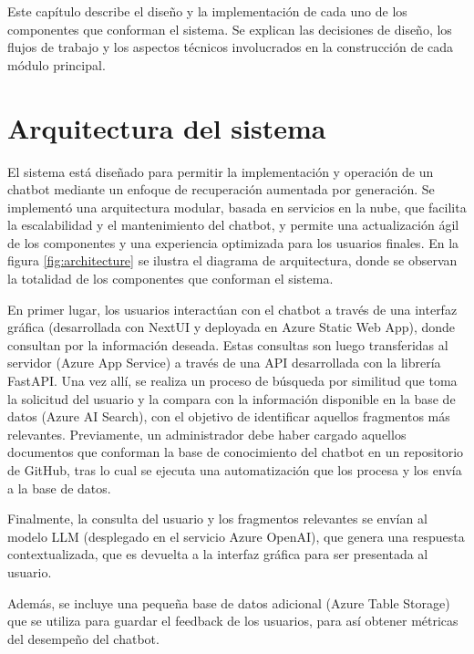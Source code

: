 
Este capítulo describe el diseño y la implementación de cada uno de los componentes que conforman el sistema.
Se explican las decisiones de diseño, los flujos de trabajo y los aspectos técnicos involucrados en la construcción de cada módulo principal.

\section{Arquitectura del sistema}

El sistema está diseñado para permitir la implementación y operación de un chatbot mediante un enfoque de recuperación aumentada por generación. 
Se implementó una arquitectura modular, basada en servicios en la nube, que facilita la escalabilidad y el mantenimiento del chatbot, y permite 
una actualización ágil de los componentes y una experiencia optimizada para los usuarios finales. En la figura \ref{fig:architecture} se ilustra
el diagrama de arquitectura, donde se observan la totalidad de los componentes que conforman el sistema.

En primer lugar, los usuarios interactúan con el chatbot a través de una interfaz gráfica (desarrollada con NextUI y deployada en Azure Static Web App), 
donde consultan por la información deseada. Estas consultas son luego transferidas al servidor (Azure App Service) a través de una API desarrollada 
con la librería FastAPI. Una vez allí, se realiza un proceso de búsqueda por similitud que toma la solicitud del usuario y la compara con la información
disponible en la base de datos (Azure AI Search), con el objetivo de identificar aquellos fragmentos más relevantes. Previamente, un administrador
debe haber cargado aquellos documentos que conforman la base de conocimiento del chatbot en un repositorio de GitHub, tras lo cual se ejecuta una 
automatización que los procesa y los envía a la base de datos.

Finalmente, la consulta del usuario y los fragmentos relevantes se envían al modelo LLM (desplegado en el servicio Azure OpenAI), que genera una 
respuesta contextualizada, que es devuelta a la interfaz gráfica para ser presentada al usuario.

Además, se incluye una pequeña base de datos adicional (Azure Table Storage) que se utiliza para guardar el feedback de los usuarios, 
para así obtener métricas del desempeño del chatbot.  

